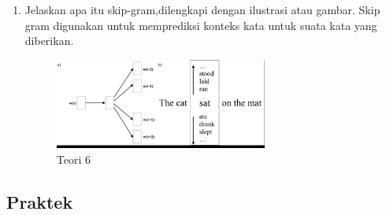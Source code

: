 \begin{enumerate}
	\item Jelaskan apa itu skip-gram,dilengkapi dengan ilustrasi atau gambar.
	\hfill\break
	Skip gram digunakan untuk memprediksi konteks kata untuk suata kata yang diberikan.
	\hfill\break
	\begin{figure}[H]
		\includegraphics[width=7cm]{figures/1174079/5/6.png}
		\centering
		\caption{Teori 6}
	\end{figure}
\end{enumerate}
\subsection{Praktek}
